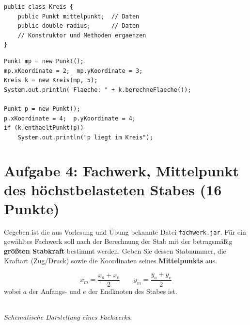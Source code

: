 \documentclass[
	fontsize=12pt,
	paper=a4,
	numbers=noenddot,
	parskip=half,
	openany
]{scrbook}
\begin{document}
\begin{lstlisting}
public class Kreis {
    public Punkt mittelpunkt;  // Daten
    public double radius;      // Daten
    // Konstruktor und Methoden ergaenzen
}
\end{lstlisting}

\begin{lstlisting}
Punkt mp = new Punkt();
mp.xKoordinate = 2;  mp.yKoordinate = 3;
Kreis k = new Kreis(mp, 5);
System.out.println("Flaeche: " + k.berechneFlaeche());

Punkt p = new Punkt();
p.xKoordinate = 4;  p.yKoordinate = 4;
if (k.enthaeltPunkt(p))
    System.out.println("p liegt im Kreis");
\end{lstlisting}

\clearpage
\section*{Aufgabe 4: Fachwerk, Mittelpunkt des höchstbelasteten Stabes \hfill (16 Punkte)}

Gegeben ist die aus Vorlesung und Übung bekannte Datei \texttt{fachwerk.jar}.
Für ein gewähltes Fachwerk soll nach der Berechnung der Stab mit der betragsmäßig \textbf{größten Stabkraft} bestimmt werden.
Geben Sie dessen Stabnummer, die Kraftart (Zug/Druck) sowie die Koordinaten seines \textbf{Mittelpunkts} aus.

\begin{formeln}
\[ x_m = \frac{x_a + x_e}{2} \qquad y_m = \frac{y_a + y_e}{2} \]
wobei $a$ der Anfangs- und $e$ der Endknoten des Stabes ist.
\end{formeln}

\begin{center}
\\[-0.3em]
{\footnotesize\itshape Schematische Darstellung eines Fachwerks.}
\end{center}
\end{document}
